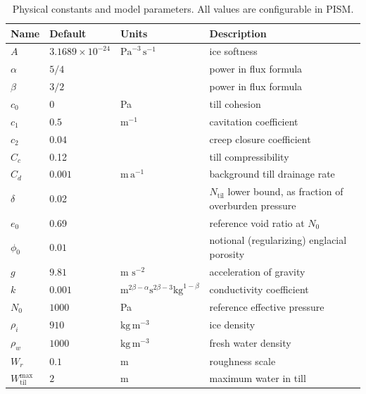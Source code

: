 \documentclass[gmd]{copernicus}   %
\newcommand{\text}{\textrm}
\newcommand{\Ntil}{N_{\text{til}}}
\newcommand{\Wtilmax}{W_{\text{til}}^{\text{max}}}
\begin{document}
\begin{table}[ht]
  \centering
  \caption{Physical constants and model parameters.  All values are configurable in PISM.}
  \begin{tabular}{lllp{3.0in}} 
    \textbf{Name} & \textbf{Default} & \textbf{Units} & \textbf{Description}\\
\hline
    $A$ & $3.1689\times 10^{-24}$ & $\text{Pa}^{-3}\,\text{s}^{-1}$ & ice softness \citep{EISMINT96} \phantom{$\Big|$} \\
    $\alpha$ & $5/4$ & & power in flux formula  \citep{Schoofetal2012} \\
    $\beta$ & $3/2$ & & power in flux formula  \citep{Schoofetal2012} \\
    $c_0$ & 0 & Pa & till cohesion \citep{Tulaczyketal2000} \\
    $c_1$ & $0.5$ & $\text{m}^{-1}$ & cavitation coefficient \citep{Schoofetal2012} \\
    $c_2$ & $0.04$ & & creep closure coefficient \\
    $C_c$ & 0.12 &  & till compressibility \citep{Tulaczyketal2000} \\
    $C_d$ & $0.001$ &  $\text{m}\,\text{a}^{-1}$ & background till drainage rate \\
    $\delta$ & 0.02 &  & $\Ntil$ lower bound, as fraction of overburden pressure \\
    $e_0$ & 0.69 &  & reference void ratio at $N_0$ \citep{Tulaczyketal2000} \\
    $\phi_0$ & $0.01$ & & notional (regularizing) englacial porosity \\
    $g$ & $9.81$ & m $\text{s}^{-2}$ & acceleration of gravity \\
    $k$ & $0.001$ & $\text{m}^{2\beta-\alpha} \text{s}^{2\beta-3} \text{kg}^{1-\beta}$ & conductivity coefficient \citep{Schoofetal2012} \\
    $N_0$ & $1000$ & Pa & reference effective pressure \citep{Tulaczyketal2000} \\
    $\rho_i$ & $910$ & $\text{kg}\,\text{m}^{-3}$ & ice density \citep{GreveBlatter2009} \\
    $\rho_w$ & $1000$ & $\text{kg}\,\text{m}^{-3}$ & fresh water density \citep{GreveBlatter2009} \\
    $W_r$ & $0.1$ & $\text{m}$ & roughness scale \citep{Hewittetal2012} \\
    $\Wtilmax$ & $2\phantom{\Big|}$ & $\text{m}$ & maximum water in till \citep{BBssasliding} \\
    \hline
  \end{tabular}
 \label{tab:constants}
\end{table}
\end{document}
